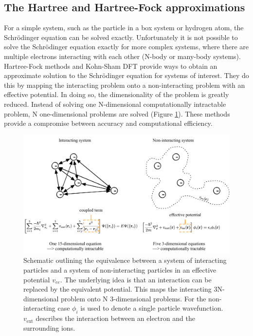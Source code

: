\subsection{The Hartree and Hartree-Fock approximations}

For a simple system, such as the particle in a box system or hydrogen atom, the Schr\"{o}dinger equation can be solved exactly. Unfortunately it is not possible to solve the Schr\"{o}dinger equation exactly for more complex systems, where there are multiple electrons interacting with each other (N-body or many-body systems). 
Hartree-Fock methods and Kohn-Sham DFT provide ways to obtain an approximate solution to the Schr\"{o}dinger equation for systems of interest. They do this by mapping the interacting problem onto a non-interacting problem with an effective potential. In doing so, the dimensionality of the problem is greatly reduced. Instead of solving one N-dimensional computationally intractable problem, N one-dimensional problems are solved (Figure \ref{decouple}). These methods provide a compromise between accuracy and computational efficiency.

\begin{figure}[h]
\centering
  \includegraphics[width=1.0\columnwidth]{figures/ch3/decouple.png}
  \caption[Interacting and non-interacting particle systems]{Schematic outlining the equivalence between a system of interacting particles and a system of non-interacting particles in an effective potential $v_{ee}$. The underlying idea is that an interaction can be replaced by the equivalent potential. This maps the interacting 3N-dimensional problem onto N 3-dimensional problems. For the non-interacting case $\phi_i$ is used to denote a single particle wavefunction. $v_{\textrm{ext}}$ describes the interaction between an electron and the surrounding ions.} %
  \label{decouple}
\end{figure}  %

